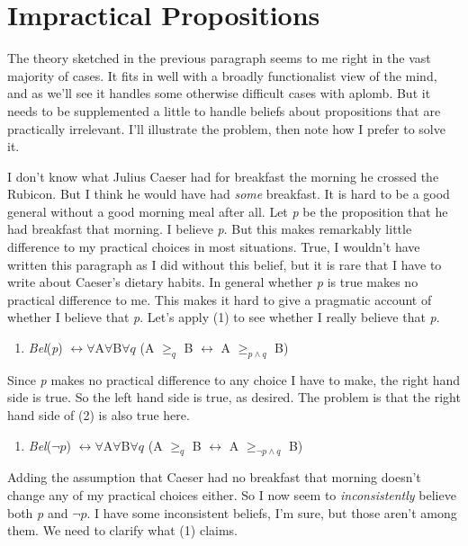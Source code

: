 \documentclass[
  11pt,
  letterpaper,
  DIV=11,
  numbers=noendperiod,
  oneside]{scrartcl}
\providecommand{\tightlist}{%
  \setlength{\itemsep}{0pt}\setlength{\parskip}{0pt}}\usepackage{longtable,booktabs,array}
\begin{document}
\section{Impractical Propositions}\label{impractical-propositions}

The theory sketched in the previous paragraph seems to me right in the
vast majority of cases. It fits in well with a broadly functionalist
view of the mind, and as we'll see it handles some otherwise difficult
cases with aplomb. But it needs to be supplemented a little to handle
beliefs about propositions that are practically irrelevant. I'll
illustrate the problem, then note how I prefer to solve it.

I don't know what Julius Caeser had for breakfast the morning he crossed
the Rubicon. But I think he would have had \emph{some} breakfast. It is
hard to be a good general without a good morning meal after all. Let
\emph{p} be the proposition that he had breakfast that morning. I
believe \emph{p}. But this makes remarkably little difference to my
practical choices in most situations. True, I wouldn't have written this
paragraph as I did without this belief, but it is rare that I have to
write about Caeser's dietary habits. In general whether \emph{p} is true
makes no practical difference to me. This makes it hard to give a
pragmatic account of whether I believe that \emph{p}. Let's apply (1) to
see whether I really believe that \emph{p}.

\begin{enumerate}
\def\labelenumi{\arabic{enumi}.}
\tightlist
\item
  \emph{Bel}(\emph{p})
  \(\leftrightarrow \forall\)A\(\forall\)B\(\forall q\) (A \(\geq _q\) B
  \(\leftrightarrow\) A \(\geq _{p \wedge q}\) B)
\end{enumerate}

Since \emph{p} makes no practical difference to any choice I have to
make, the right hand side is true. So the left hand side is true, as
desired. The problem is that the right hand side of (2) is also true
here.

\begin{enumerate}
\def\labelenumi{\arabic{enumi}.}
\setcounter{enumi}{1}
\tightlist
\item
  \emph{Bel}(\(\neg p\))
  \(\leftrightarrow \forall\)A\(\forall\)B\(\forall q\) (A \(\geq _q\) B
  \(\leftrightarrow\) A \(\geq _{\neg p \wedge q}\) B)
\end{enumerate}

Adding the assumption that Caeser had no breakfast that morning doesn't
change any of my practical choices either. So I now seem to
\emph{inconsistently} believe both \emph{p} and \(\neg p\). I have some
inconsistent beliefs, I'm sure, but those aren't among them. We need to
clarify what (1) claims.
\end{document}
